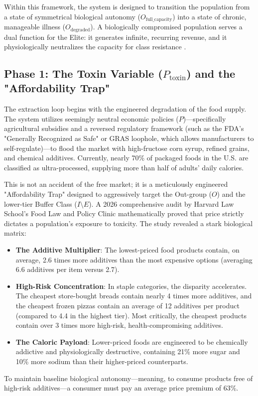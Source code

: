 \documentclass[12pt,openany]{book}
\begin{document}
Within this framework, the system is designed to transition the population from a state of symmetrical biological autonomy ($O_{\text{full\_capacity}}$) into a state of chronic, manageable illness ($O_{\text{degraded}}$). A biologically compromised population serves a dual function for the Elite: it generates infinite, recurring revenue, and it physiologically neutralizes the capacity for class resistance \cite{washington}.

\subsection{Phase 1: The Toxin Variable (\texorpdfstring{$P_{\text{toxin}}$}{P\_toxin}) and the "Affordability Trap"}

The extraction loop begins with the engineered degradation of the food supply. The system utilizes seemingly neutral economic policies ($P$)—specifically agricultural subsidies and a reversed regulatory framework (such as the FDA's "Generally Recognized as Safe" or GRAS loophole, which allows manufacturers to self-regulate)—to flood the market with high-fructose corn syrup, refined grains, and chemical additives. Currently, nearly 70\% of packaged foods in the U.S. are classified as ultra-processed, supplying more than half of adults' daily calories.

This is not an accident of the free market; it is a meticulously engineered "Affordability Trap" designed to aggressively target the Out-group ($O$) and the lower-tier Buffer Class ($I \setminus E$). A 2026 comprehensive audit by Harvard Law School’s Food Law and Policy Clinic mathematically proved that price strictly dictates a population's exposure to toxicity.
The study revealed a stark biological matrix:
\begin{itemize}
    \item \textbf{The Additive Multiplier}: The lowest-priced food products contain, on average, 2.6 times more additives than the most expensive options (averaging 6.6 additives per item versus 2.7).
    \item \textbf{High-Risk Concentration}: In staple categories, the disparity accelerates. The cheapest store-bought breads contain nearly 4 times more additives, and the cheapest frozen pizzas contain an average of 12 additives per product (compared to 4.4 in the highest tier). Most critically, the cheapest products contain over 3 times more high-risk, health-compromising additives.
    \item \textbf{The Caloric Payload}: Lower-priced foods are engineered to be chemically addictive and physiologically destructive, containing 21\% more sugar and 10\% more sodium than their higher-priced counterparts.
\end{itemize}
To maintain baseline biological autonomy—meaning, to consume products free of high-risk additives—a consumer must pay an average price premium of 63\%.
\end{document}
